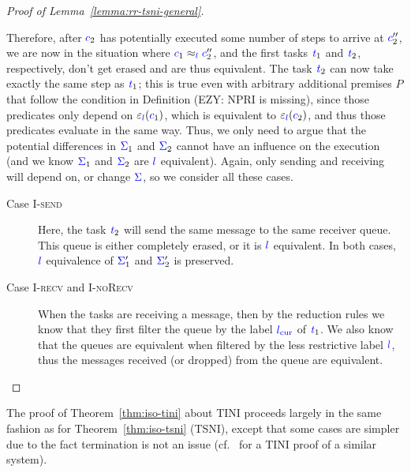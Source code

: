 \documentclass{sigplanconf}
\newcommand{\Varid}[1]{\mathit{#1}}
\newcommand{\Red}[1]{{\color{red} #1}}
\begin{document}
\begin{proof}[Proof of Lemma~\ref{lemma:rr-tsni-general}]
\begin{itemize}
    Therefore, after \ensuremath{\ifc{c}_{2}} has potentially executed some number of steps
    to arrive at \ensuremath{\ifc{c}_{2}''}, we are now in the situation where ${\color{blue} c}_{1}\approx_{{\color{blue} l}}{\color{blue} c}_{2}''$, and the first tasks \ensuremath{\ifc{\Varid{t}}_{1}} and \ensuremath{\ifc{\Varid{t}}_{2}},
    respectively, don't get erased and are thus equivalent.
    The task \ensuremath{\ifc{\Varid{t}}_{2}} can now take exactly the same step as \ensuremath{\ifc{\Varid{t}}_{1}};  this
    is true even with arbitrary additional premises $P$ that follow
    the condition in \Red{Definition (EZY: NPRI is missing)}, since those
    predicates only depend on \ensuremath{\varepsilon_{\ifc{l}}(\ifc{c}_{1})}, which is equivalent
    to \ensuremath{\varepsilon_{\ifc{l}}(\ifc{c}_{2})}, and thus those predicates evaluate in the same way.
    Thus, we only
    need to argue that the potential differences in \ensuremath{\ifc{\Sigma}_{1}} and \ensuremath{\ifc{\Sigma}_{2}} cannot
    have an influence on the execution (and we know \ensuremath{\ifc{\Sigma}_{1}} and \ensuremath{\ifc{\Sigma}_{2}} are
    \ensuremath{\ifc{l}} equivalent).
    Again, only sending and receiving will depend on, or change \ensuremath{\ifc{\Sigma}},
    so we consider all these cases.
    \begin{description}
      \item[Case \textsc{I-send}]
      Here, the task \ensuremath{\ifc{\Varid{t}}_{2}} will send the same message to the same
      receiver queue. This
      queue is either completely erased, or it is \ensuremath{\ifc{l}} equivalent.  In both
      cases, \ensuremath{\ifc{l}} equivalence of \ensuremath{\ifc{\Sigma}_{1}'} and \ensuremath{\ifc{\Sigma}_{2}'} is preserved.
      \item[Case \textsc{I-recv} and \textsc{I-noRecv}]
      When the tasks are receiving a message, then by the reduction rules
      we know that they first filter the queue by the label
      \ensuremath{\lcurr} of \ensuremath{\ifc{\Varid{t}}_{1}}.  We
      also know that the queues are equivalent when filtered by the less
      restrictive label \ensuremath{\ifc{l}}, thus the messages received (or dropped) from the
      queue are equivalent.
    \end{description}
  \end{itemize}
\end{proof}


The proof of Theorem~\ref{thm:iso-tini} about TINI proceeds largely
in the same fashion as for Theorem~\ref{thm:iso-tsni} (TSNI), except that
some cases are simpler due to the fact termination is not an issue
(cf.~\cite{lio} for a TINI proof of a similar system).
\end{document}
